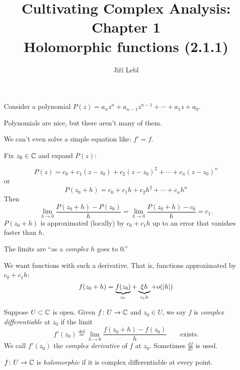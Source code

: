 \documentclass[10pt,aspectratio=169]{beamer}
\author{Ji\v{r}\'i Lebl}
\institute[OSU]{%
Departemento pri Matematiko de Oklahoma {\^S}tata Universitato}
\title{Cultivating Complex Analysis: Chapter 1\\%
Holomorphic functions (2.1.1)}
\date{}
\begin{document}
\begin{frame}
\titlepage
\end{frame}

\begin{frame}

\section{}
Consider a polynomial
$P(z) = a_n z^n + a_{n-1} z^{n-1} + \cdots + a_1 z + a_0$.

\medskip
\pause

Polynomials are nice, but there aren't many of them.

\medskip
\pause

We can't even solve a simple equation like: $f'=f$.

\medskip
\pause

Fix $z_0 \in {\mathbb{C}}$ and expand $P(z)$:

\[
P(z) = c_0 + c_1 (z-z_0) + c_2 {(z-z_0)}^2 + \cdots + c_n {(z-z_0)}^n
\]
\pause
or
\[
P(z_0+h) = c_0 + c_1 h + c_2 h^2 + \cdots + c_n h^n
\]
\pause
Then
\[
\lim_{h \to 0} \frac{P(z_0+h) - P(z_0)}{h} =
\lim_{h \to 0} \frac{P(z_0+h) - c_0}{h} = c_1 .
\]
\pause
$P(z_0+h)$ is approximated (locally) by $c_0 + c_1 h$
up to an error that vanishes faster than $h$.

\medskip
\pause

The limits are ``as a \emph{complex} $h$ goes to $0$.''

\end{frame}

\begin{frame}
We want functions with such a derivative.  That is, functions approximated
by $c_0 + c_1 h$:
\[
f(z_0+h) = \underbrace{f(z_0)}_{c_0} + \underbrace{\xi h}_{c_1 h} + o(\lvert {h} \rvert)
\]

\medskip
\pause

\begin{definition}
Suppose $U \subset {\mathbb{C}}$ is open.
Given $f \colon U \to {\mathbb{C}}$ and $z_0 \in U$, we say 
$f$ is \emph{complex differentiable} at $z_0$ if
the limit
\[
f'(z_0) \overset{\text{def}}{=}
\lim_{h \to 0} \frac{f(z_0+h) - f(z_0)}{h}
\qquad \text{exists.}
\]
\pause
We call $f'(z_0)$ the \emph{complex derivative} of $f$
at $z_0$.  Sometimes $\frac{df}{dz}$ is used.
\pause

$f \colon U \to {\mathbb{C}}$ is
\emph{holomorphic}
if it is complex differentiable at every point.
\end{definition}

\end{frame}
\end{document}
